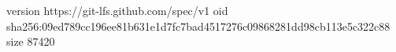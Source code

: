 version https://git-lfs.github.com/spec/v1
oid sha256:09ed789cc196ee81b631e1d7fc7bad4517276c09868281dd98cb113e5c322c88
size 87420
